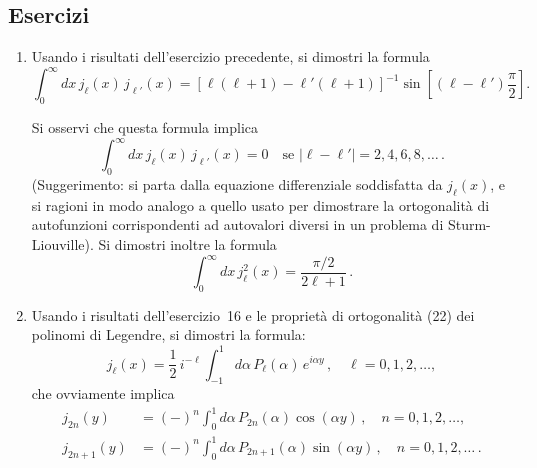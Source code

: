 \documentclass[11pt, a4paper]{book}
\numberwithin{equation}{section}
\newenvironment{esercizi}{\subsection*{Esercizi}\begin{enumerate}}{\end{enumerate}}
\begin{document}
\begin{esercizi}
\begin{enumerate}
Si osservi che una rappresentazione equivalente (ma per certi aspetti più conveniente) è
\begin{multline*}
y\,j_\ell(y) = \sin\!\left(y-\ell\frac{\pi}{2}\right)\cdot
\sum_{n=0}^{[\ell/2]}\frac{(-)^n(2y)^{-2n}(\ell+2n)!}{(2n)!\,(\ell-2n)!}\\
+\cos\!\left(y-\ell\frac{\pi}{2}\right)\sum_{n=0}^{[(\ell-1)/2]}\frac{(-)^n(2y)^{-2n-1}(\ell+2n+1)!}{(2n+1)!\,(\ell-2n-1)!}\,,
\end{multline*}
e che questa rappresentazione implica che, per $y\gg\ell^2$,
\begin{align*}
j_\ell(y) &= y^{-1}\sin\!\left(y-\ell\frac{\pi}{2}\right)\left\{1+O\!\left[(\ell^2/y)^2\right]\right\}\\
&\quad+\tfrac{1}{2}\,\ell(\ell+1)\,y^{-2}\cos\!\left(y-\ell\frac{\pi}{2}\right)\left\{1+O\!\left[(\ell^2/y)^2\right]\right\}.
\end{align*}
In particolare
\begin{align*}
j_0(y) &= y^{-1}\sin y\,,\\
j_1(y) &= y^{-2}\sin y - y^{-1}\cos y\,,\\
j_2(y) &= \left[3y^{-3}-y^{-1}\right]\sin y - 3y^{-2}\cos y\,.
\end{align*}
(Suggerimenti: per dimostrare la prima formula, che fornisce la rappresentazione integrale delle funzioni sferiche di Bessel, si usino la~(32) e la~(25), e si integri ripetutamente per parti. Le formule successive seguono abbastanza direttamente dalla rappresentazione integrale).

\item[*] Usando i risultati dell'esercizio precedente, si dimostri la formula
\[
\int_0^{\infty}dx\,j_\ell(x)\,j_{\ell'}(x) = \left[\ell(\ell+1)-\ell'(\ell+1)\right]^{-1}\sin\!\left[(\ell-\ell')\frac{\pi}{2}\right].
\]

Si osservi che questa formula implica
\[
\int_0^{\infty}dx\,j_\ell(x)\,j_{\ell'}(x) = 0 \quad \text{se } |\ell-\ell'| = 2,4,6,8,\ldots\,.
\]
(Suggerimento: si parta dalla equazione differenziale soddisfatta da $j_\ell(x)$, e si ragioni in modo analogo a quello usato per dimostrare la ortogonalità di autofunzioni corrispondenti ad autovalori diversi in un problema di Sturm-Liouville). Si dimostri inoltre la formula
\[
\int_0^{\infty}dx\,j_\ell^2(x) = \frac{\pi/2}{2\ell+1}\,.
\]

\item Usando i risultati dell'esercizio~16 e le proprietà di ortogonalità (22) dei polinomi di Legendre, si dimostri la formula:
\[
j_\ell(x) = \frac{1}{2}\,i^{-\ell}\int_{-1}^{1}d\alpha\,P_\ell(\alpha)\,e^{i\alpha y}\,, \quad \ell=0,1,2,\ldots,
\]
che ovviamente implica
\begin{align*}
j_{2n}(y) &= (-)^n\int_0^1 d\alpha\,P_{2n}(\alpha)\cos(\alpha y)\,, \quad n=0,1,2,\ldots,\\
j_{2n+1}(y) &= (-)^n\int_0^1 d\alpha\,P_{2n+1}(\alpha)\sin(\alpha y)\,, \quad n=0,1,2,\ldots\,.
\end{align*}


\end{enumerate}
\end{esercizi}
\end{document}
